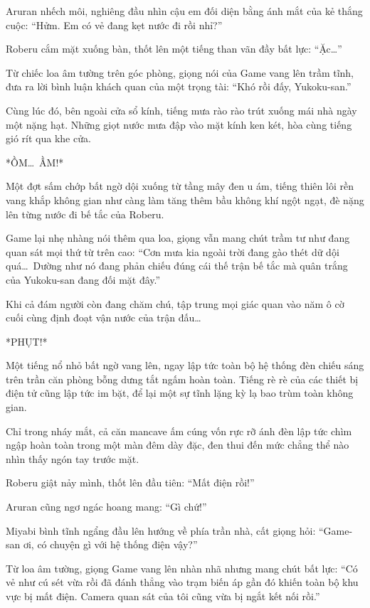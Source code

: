 \documentclass[../main.tex]{subfiles}
\begin{document}

Aruran nhếch môi, nghiêng đầu nhìn cậu em đối diện bằng ánh mắt của kẻ thắng cuộc: ``Hửm. Em có vẻ đang kẹt nước đi rồi nhỉ?''

Roberu cắm mặt xuống bàn, thốt lên một tiếng than vãn đầy bất lực: ``Ặc\dots''

Từ chiếc loa âm tường trên góc phòng, giọng nói của Game vang lên trầm tĩnh, đưa ra lời bình luận khách quan của một trọng tài: ``Khó rồi đấy, Yukoku-san.''

Cùng lúc đó, bên ngoài cửa sổ kính, tiếng mưa rào rào trút xuống mái nhà ngày một nặng hạt. Những giọt nước mưa đập vào mặt kính ken két, hòa cùng tiếng gió rít qua khe cửa.

*ỒM\dots\ ẦM!*

Một đợt sấm chớp bất ngờ dội xuống từ tầng mây đen u ám, tiếng thiên lôi rền vang khắp không gian như càng làm tăng thêm bầu không khí ngột ngạt, đè nặng lên từng nước đi bế tắc của Roberu.

Game lại nhẹ nhàng nói thêm qua loa, giọng vẫn mang chút trầm tư như đang quan sát mọi thứ từ trên cao: ``Cơn mưa kia ngoài trời đang gào thét dữ dội quá\dots\ Dường như nó đang phản chiếu đúng cái thế trận bế tắc mà quân trắng của Yukoku-san đang đối mặt đây.''

Khi cả đám người còn đang chăm chú, tập trung mọi giác quan vào năm ô cờ cuối cùng định đoạt vận nước của trận đấu\dots

*PHỤT!*

Một tiếng nổ nhỏ bất ngờ vang lên, ngay lập tức toàn bộ hệ thống đèn chiếu sáng trên trần căn phòng bỗng dưng tắt ngấm hoàn toàn. Tiếng rè rè của các thiết bị điện tử cũng lập tức im bặt, để lại một sự tĩnh lặng kỳ lạ bao trùm toàn không gian.

Chỉ trong nháy mắt, cả căn mancave ấm cúng vốn rực rỡ ánh đèn lập tức chìm ngập hoàn toàn trong một màn đêm dày đặc, đen thui đến mức chẳng thể nào nhìn thấy ngón tay trước mặt.

Roberu giật nảy mình, thốt lên đầu tiên: ``Mất điện rồi!''

Aruran cũng ngơ ngác hoang mang: ``Gì chứ!''

Miyabi bình tĩnh ngẩng đầu lên hướng về phía trần nhà, cất giọng hỏi: ``Game-san ơi, có chuyện gì với hệ thống điện vậy?''

Từ loa âm tường, giọng Game vang lên nhàn nhã nhưng mang chút bất lực: ``Có vẻ như cú sét vừa rồi đã đánh thẳng vào trạm biến áp gần đó khiến toàn bộ khu vực bị mất điện. Camera quan sát của tôi cũng vừa bị ngắt kết nối rồi.''
\end{document}
